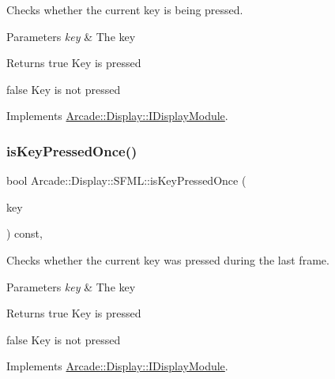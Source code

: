 Checks whether the current key is being pressed. 


\begin{DoxyParams}{Parameters}
{\em key} & The key \\
\hline
\end{DoxyParams}
\begin{DoxyReturn}{Returns}
true Key is pressed 

false Key is not pressed 
\end{DoxyReturn}


Implements \mbox{\hyperlink{classArcade_1_1Display_1_1IDisplayModule_af871661ff84c21581cd7233ba6f27aa0}{Arcade\+::\+Display\+::\+I\+Display\+Module}}.

\mbox{\label{classArcade_1_1Display_1_1SFML_a5695d2a080b43f958adf3a63acf5cf78}} 
\subsubsection{\texorpdfstring{isKeyPressedOnce()}{isKeyPressedOnce()}}
{\footnotesize\ttfamily bool Arcade\+::\+Display\+::\+S\+F\+M\+L\+::is\+Key\+Pressed\+Once (\begin{DoxyParamCaption}\item[{\mbox{\hyperlink{classArcade_1_1Display_1_1IDisplayModule_a8da3f6b309ca0581473ae8cc8789b619}{I\+Display\+Module\+::\+Keys}}}]{key }\end{DoxyParamCaption}) const\hspace{0.3cm}{\ttfamily [final]}, {\ttfamily [virtual]}}



Checks whether the current key was pressed during the last frame. 


\begin{DoxyParams}{Parameters}
{\em key} & The key \\
\hline
\end{DoxyParams}
\begin{DoxyReturn}{Returns}
true Key is pressed 

false Key is not pressed 
\end{DoxyReturn}


Implements \mbox{\hyperlink{classArcade_1_1Display_1_1IDisplayModule_a531b700b332e077d9b714bafac05ebe1}{Arcade\+::\+Display\+::\+I\+Display\+Module}}.

